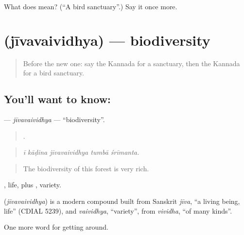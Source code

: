 \begin{tcolorbox}[breakable,colback=teal!4,colframe=teal!35!black,title={Before you move on}]
What does  mean? (\textquotedblleft{}A bird sanctuary\textquotedblright{}.) Say it once more.
\end{tcolorbox}
\section[\texorpdfstring{\kn{ಜೀವವೈವಿಧ್ಯ} (jīvavaividhya)}{ಜೀವವೈವಿಧ್ಯ (jīvavaividhya)}]{ (jīvavaividhya) — biodiversity}

\label{lesson:KA-C476-jivavaividhya}



\begin{quote}
Before the new one: say the Kannada for a sanctuary, then the Kannada for a bird sanctuary.
\end{quote}

\subsection*{You'll want to know: }
\textbf{} — \emph{jīvavaividhya} — \textquotedblleft{}biodiversity\textquotedblright{}.

\begin{quote}
    .
\end{quote}

\begin{quote}
\emph{ī kāḍina jīvavaividhya tumbā śrīmanta.}
\end{quote}

\begin{quote}
The biodiversity of this forest is very rich.
\end{quote}

, life, plus , variety.

\begin{cousinweb}
\textbf{} (\emph{jīvavaividhya}) is a modern compound built from Sanskrit \emph{jīva}, \textquotedblleft{}a living being, life\textquotedblright{} (CDIAL 5239), and \emph{vaividhya}, \textquotedblleft{}variety\textquotedblright{}, from \emph{vividha}, \textquotedblleft{}of many kinds\textquotedblright{}.
\end{cousinweb}

\begin{grammarlens}[title={What you've built}]
One more word for getting around.
\end{grammarlens}

